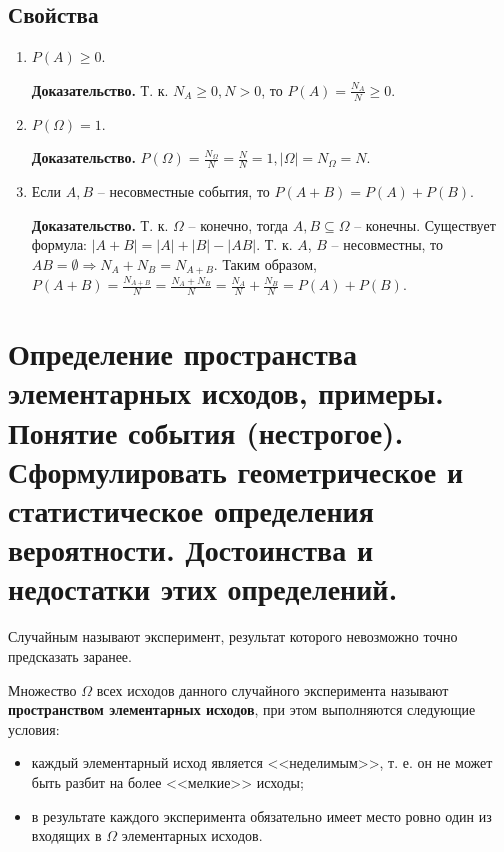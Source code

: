 \subsection*{Свойства}

\begin{enumerate}
	\item $P(A) \geq 0$.
	
	\textbf{Доказательство.} Т. к. $N_A \geq 0, N > 0$, то $P(A) = \frac{N_A}{N} \geq 0$.
	
	\item $P(\Omega) = 1$.
	
	\textbf{Доказательство.} $P(\Omega) = \frac{N_\Omega}{N} = \frac{N}{N} = 1, |\Omega| = N_\Omega = N$.
	
	\item Если $A, B$ -- несовместные события, то $P(A + B) = P(A) + P(B)$.
	
	\textbf{Доказательство.}  Т. к. $\Omega$ -- конечно, тогда $A, B \subseteq \Omega$ -- конечны. Существует формула: $|A + B| = |A| + |B| - |AB|$. Т. к. $A$, $B$ -- несовместны, то $AB = \emptyset \Longrightarrow N_A + N_B = N_{A + B}$. Таким образом, $P(A + B) = \frac{N_{A + B}}{N} = \frac{N_A + N_B}{N} = \frac{N_A}{N} + \frac{N_B}{N} = P(A) + P(B)$.
\end{enumerate}

\section{Определение пространства элементарных исходов, примеры. Понятие события (нестрогое). Сформулировать геометрическое и статистическое определения вероятности. Достоинства и недостатки этих определений.}

Случайным называют эксперимент, результат которого невозможно точно предсказать заранее.

Множество $\Omega$ всех исходов данного случайного эксперимента называют \textbf{пространством элементарных исходов}, при этом выполняются следующие условия: 

\begin{itemize}
	\item каждый элементарный исход является <<неделимым>>, т. е. он не может быть разбит на более <<мелкие>> исходы;
	
	\item в результате каждого эксперимента обязательно имеет место ровно один из входящих в $\Omega$ элементарных исходов.
\end{itemize}

